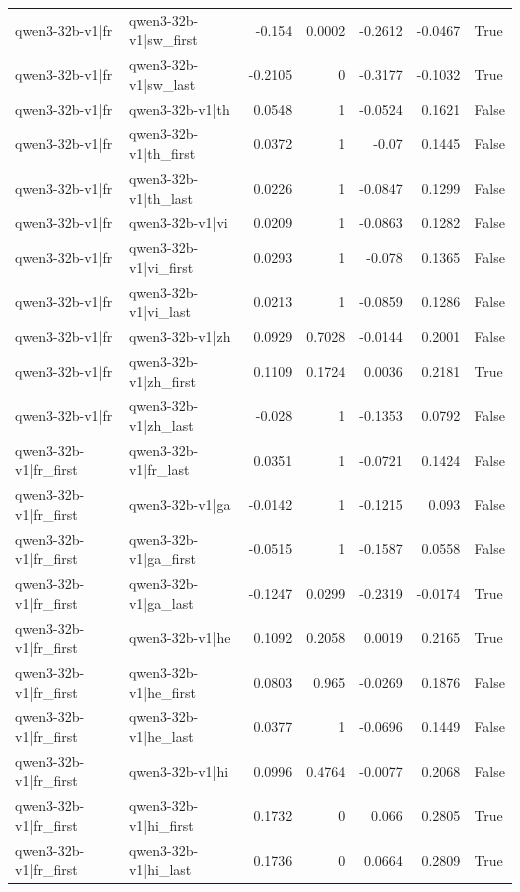 \begin{table}
\begin{tabular}{l l r r r r l}
qwen3-32b-v1|fr & qwen3-32b-v1|sw_first & -0.154 & 0.0002 & -0.2612 & -0.0467 & True \\
qwen3-32b-v1|fr & qwen3-32b-v1|sw_last & -0.2105 & 0 & -0.3177 & -0.1032 & True \\
qwen3-32b-v1|fr & qwen3-32b-v1|th & 0.0548 & 1 & -0.0524 & 0.1621 & False \\
qwen3-32b-v1|fr & qwen3-32b-v1|th_first & 0.0372 & 1 & -0.07 & 0.1445 & False \\
qwen3-32b-v1|fr & qwen3-32b-v1|th_last & 0.0226 & 1 & -0.0847 & 0.1299 & False \\
qwen3-32b-v1|fr & qwen3-32b-v1|vi & 0.0209 & 1 & -0.0863 & 0.1282 & False \\
qwen3-32b-v1|fr & qwen3-32b-v1|vi_first & 0.0293 & 1 & -0.078 & 0.1365 & False \\
qwen3-32b-v1|fr & qwen3-32b-v1|vi_last & 0.0213 & 1 & -0.0859 & 0.1286 & False \\
qwen3-32b-v1|fr & qwen3-32b-v1|zh & 0.0929 & 0.7028 & -0.0144 & 0.2001 & False \\
qwen3-32b-v1|fr & qwen3-32b-v1|zh_first & 0.1109 & 0.1724 & 0.0036 & 0.2181 & True \\
qwen3-32b-v1|fr & qwen3-32b-v1|zh_last & -0.028 & 1 & -0.1353 & 0.0792 & False \\
qwen3-32b-v1|fr_first & qwen3-32b-v1|fr_last & 0.0351 & 1 & -0.0721 & 0.1424 & False \\
qwen3-32b-v1|fr_first & qwen3-32b-v1|ga & -0.0142 & 1 & -0.1215 & 0.093 & False \\
qwen3-32b-v1|fr_first & qwen3-32b-v1|ga_first & -0.0515 & 1 & -0.1587 & 0.0558 & False \\
qwen3-32b-v1|fr_first & qwen3-32b-v1|ga_last & -0.1247 & 0.0299 & -0.2319 & -0.0174 & True \\
qwen3-32b-v1|fr_first & qwen3-32b-v1|he & 0.1092 & 0.2058 & 0.0019 & 0.2165 & True \\
qwen3-32b-v1|fr_first & qwen3-32b-v1|he_first & 0.0803 & 0.965 & -0.0269 & 0.1876 & False \\
qwen3-32b-v1|fr_first & qwen3-32b-v1|he_last & 0.0377 & 1 & -0.0696 & 0.1449 & False \\
qwen3-32b-v1|fr_first & qwen3-32b-v1|hi & 0.0996 & 0.4764 & -0.0077 & 0.2068 & False \\
qwen3-32b-v1|fr_first & qwen3-32b-v1|hi_first & 0.1732 & 0 & 0.066 & 0.2805 & True \\
qwen3-32b-v1|fr_first & qwen3-32b-v1|hi_last & 0.1736 & 0 & 0.0664 & 0.2809 & True \\

\end{tabular}
\end{table}
